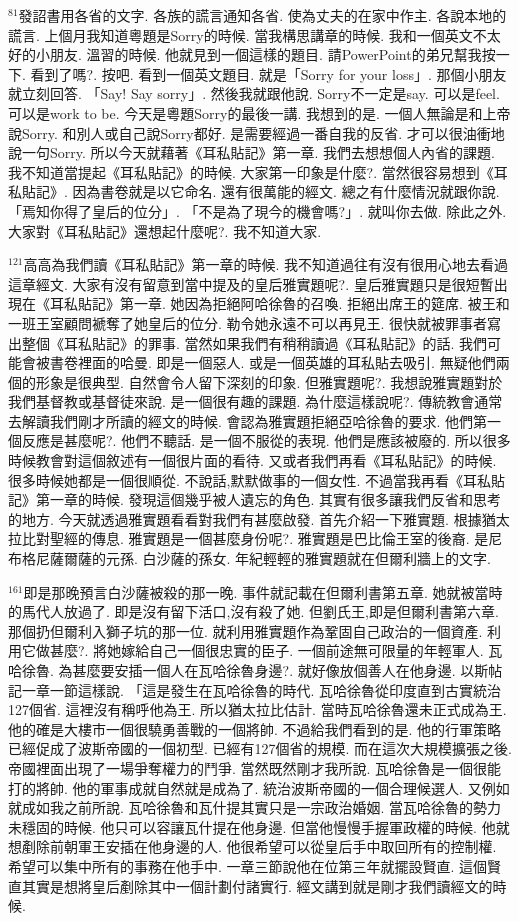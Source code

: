 \documentclass{book}
\begin{document}
$^{81}$發詔書用各省的文字.
各族的謊言通知各省.
使為丈夫的在家中作主.
各說本地的謊言.
上個月我知道粵題是Sorry的時候.
當我構思講章的時候.
我和一個英文不太好的小朋友.
溫習的時候.
他就見到一個這樣的題目.
請PowerPoint的弟兄幫我按一下.
看到了嗎?.
按吧.
看到一個英文題目.
就是「Sorry for your loss」.
那個小朋友就立刻回答.
「Say! Say sorry」.
然後我就跟他說.
Sorry不一定是say.
可以是feel.
可以是work to be.
今天是粵題Sorry的最後一講.
我想到的是.
一個人無論是和上帝說Sorry.
和別人或自己說Sorry都好.
是需要經過一番自我的反省.
才可以很油衝地說一句Sorry.
所以今天就藉著《耳私貼記》第一章.
我們去想想個人內省的課題.
我不知道當提起《耳私貼記》的時候.
大家第一印象是什麼?.
當然很容易想到《耳私貼記》.
因為書卷就是以它命名.
還有很萬能的經文.
總之有什麼情況就跟你說.
「焉知你得了皇后的位分」.
「不是為了現今的機會嗎?」.
就叫你去做.
除此之外.
大家對《耳私貼記》還想起什麼呢?.
我不知道大家.

$^{121}$高高為我們讀《耳私貼記》第一章的時候.
我不知道過往有沒有很用心地去看過這章經文.
大家有沒有留意到當中提及的皇后雅實題呢?.
皇后雅實題只是很短暫出現在《耳私貼記》第一章.
她因為拒絕阿哈徐魯的召喚.
拒絕出席王的筵席.
被王和一班王室顧問褫奪了她皇后的位分.
勒令她永遠不可以再見王.
很快就被罪事者寫出整個《耳私貼記》的罪事.
當然如果我們有稍稍讀過《耳私貼記》的話.
我們可能會被書卷裡面的哈曼.
即是一個惡人.
或是一個英雄的耳私貼去吸引.
無疑他們兩個的形象是很典型.
自然會令人留下深刻的印象.
但雅實題呢?.
我想說雅實題對於我們基督教或基督徒來說.
是一個很有趣的課題.
為什麼這樣說呢?.
傳統教會通常去解讀我們剛才所讀的經文的時候.
會認為雅實題拒絕亞哈徐魯的要求.
他們第一個反應是甚麼呢?.
他們不聽話.
是一個不服從的表現.
他們是應該被廢的.
所以很多時候教會對這個敘述有一個很片面的看待.
又或者我們再看《耳私貼記》的時候.
很多時候她都是一個很順從.
不說話,默默做事的一個女性.
不過當我再看《耳私貼記》第一章的時候.
發現這個幾乎被人遺忘的角色.
其實有很多讓我們反省和思考的地方.
今天就透過雅實題看看對我們有甚麼啟發.
首先介紹一下雅實題.
根據猶太拉比對聖經的傳息.
雅實題是一個甚麼身份呢?.
雅實題是巴比倫王室的後裔.
是尼布格尼薩爾薩的元孫.
白沙薩的孫女.
年紀輕輕的雅實題就在但爾利牆上的文字.

$^{161}$即是那晚預言白沙薩被殺的那一晚.
事件就記載在但爾利書第五章.
她就被當時的馬代人放過了.
即是沒有留下活口,沒有殺了她.
但劉氏王,即是但爾利書第六章.
那個扔但爾利入獅子坑的那一位.
就利用雅實題作為鞏固自己政治的一個資產.
利用它做甚麼?.
將她嫁給自己一個很忠實的臣子.
一個前途無可限量的年輕軍人.
瓦哈徐魯.
為甚麼要安插一個人在瓦哈徐魯身邊?.
就好像放個善人在他身邊.
以斯帖記一章一節這樣說.
「這是發生在瓦哈徐魯的時代.
瓦哈徐魯從印度直到古實統治127個省.
這裡沒有稱呼他為王.
所以猶太拉比估計.
當時瓦哈徐魯還未正式成為王.
他的確是大樓市一個很驍勇善戰的一個將帥.
不過給我們看到的是.
他的行軍策略已經促成了波斯帝國的一個初型.
已經有127個省的規模.
而在這次大規模擴張之後.
帝國裡面出現了一場爭奪權力的鬥爭.
當然既然剛才我所說.
瓦哈徐魯是一個很能打的將帥.
他的軍事成就自然就是成為了.
統治波斯帝國的一個合理候選人.
又例如就成如我之前所說.
瓦哈徐魯和瓦什提其實只是一宗政治婚姻.
當瓦哈徐魯的勢力未穩固的時候.
他只可以容讓瓦什提在他身邊.
但當他慢慢手握軍政權的時候.
他就想剷除前朝軍王安插在他身邊的人.
他很希望可以從皇后手中取回所有的控制權.
希望可以集中所有的事務在他手中.
一章三節說他在位第三年就擺設賢直.
這個賢直其實是想將皇后剷除其中一個計劃付諸實行.
經文講到就是剛才我們讀經文的時候.
\end{document}
